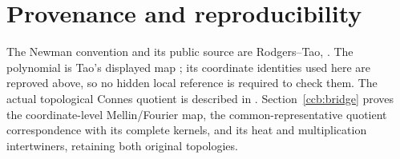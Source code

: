 \documentclass[11pt,a4paper]{article}
\theoremstyle{definition}
\theoremstyle{plain}
\begin{document}
\section{Provenance and reproducibility}
The Newman convention and its public source are Rodgers--Tao,
\cite[Section 1, equations (1)--(4)]{rodgersTao2020}.
The polynomial is Tao's displayed map
\cite[equation (1)]{tao2026jacobian}; its coordinate identities used here are
reproved above, so no hidden local reference is required to check them.
The actual topological Connes quotient is described in
\cite[Section 3.6, Proposition 3.6]{ccmProlate2024}.
Section~\ref{ccb:bridge} proves the coordinate-level Mellin/Fourier map,
the common-representative quotient correspondence with its complete
kernels, and its heat and multiplication intertwiners, retaining both
original topologies.
\end{document}

